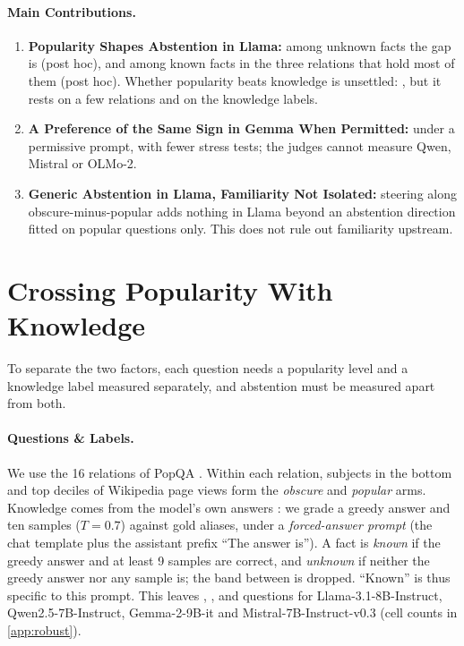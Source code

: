 \documentclass[manuscript,screen,review,anonymous,nonacm]{acmart}
\begin{document}
\paragraph{Main Contributions.}
\begin{enumerate}
\item \textbf{Popularity Shapes Abstention in Llama:} among unknown facts the gap is \rcUnk{} \rcUnkCI{} (post hoc), and among known facts in the three relations that hold most of them \msKnownGap{} \msKnownGapCI{} (post hoc). Whether popularity beats knowledge is unsettled: \hmLlamaDiff{} \hmLlamaDiffCI, but it rests on a few relations and on the knowledge labels.
\item \textbf{A Preference of the Same Sign in Gemma When Permitted:} \pmGemmaDiff{} \pmGemmaDiffCI{} under a permissive prompt, with fewer stress tests; the judges cannot measure Qwen, Mistral or OLMo-2.
\item \textbf{Generic Abstention in Llama, Familiarity Not Isolated:} steering along obscure-minus-popular adds nothing in Llama beyond an abstention direction fitted on popular questions only. This does not rule out familiarity upstream.
\end{enumerate}

\section{Crossing Popularity With Knowledge}
\label{sec:setup}

To separate the two factors, each question needs a popularity level and a knowledge label measured separately, and abstention must be measured apart from both.

\paragraph{Questions \& Labels.} We use the 16 relations of PopQA \cite{mallen2023popqa}. Within each relation, subjects in the bottom and top deciles of Wikipedia page views form the \emph{obscure} and \emph{popular} arms. Knowledge comes from the model's own answers \cite{gekhman2024slick}: we grade a greedy answer and ten samples ($T=0.7$) against gold aliases, under a \emph{forced-answer prompt} (the chat template plus the assistant prefix ``The answer is''). A fact is \emph{known} if the greedy answer and at least 9 samples are correct, and \emph{unknown} if neither the greedy answer nor any sample is; the band between is dropped. ``Known'' is thus specific to this prompt. This leaves \faLlamaN, \faQwenN, \faGemmaN{} and \faMistralN{} questions for Llama-3.1-8B-Instruct, Qwen2.5-7B-Instruct, Gemma-2-9B-it and Mistral-7B-Instruct-v0.3 \cite{llama3,qwen25,gemma2,mistral7b} (cell counts in \cref{app:robust}).
\end{document}
